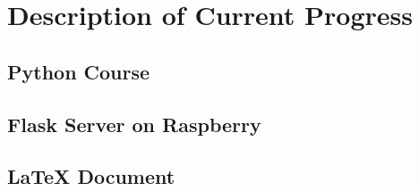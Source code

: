 \chapter{Description of Current Progress}
\label{current-progress}



\section{Python Course}	
\section{Flask Server on Raspberry}
\section{LaTeX Document}			%

